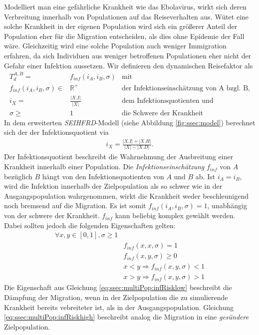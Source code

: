 Modelliert man eine gefährliche Krankheit wie das Ebolavirus, wirkt sich deren Verbreitung innerhalb von Populationen auf das Reiseverhalten aus. Wütet eine solche Krankheit in der eigenen Population wird sich ein größerer Anteil der Population eher für die Migration entscheiden, als dies ohne Epidemie der Fall wäre. Gleichzeitig wird eine solche Population auch weniger Immigration erfahren, da sich Individuen aus weniger betroffenen Populationen eher nicht der Gefahr einer Infektion aussetzen. Wir definieren den dynamischen Reisefaktor als
\begin{align}
	T^{A,B}_d =& f_{inf}(i_A,i_B, \sigma)&\text{mit}\\
	f_{inf}(i_A,i_B,\sigma) \in& \mathbb{R}^+&\text{der Infektionseinschätzung von A bzgl. B,}\label{eq:ssec:multiPop:infRisk}\\
	i_X =& \frac{|X.I|}{|X|}&\text{dem Infektionsquotienten und}\\
	\sigma \geq&1 & \text{die Schwere der Krankheit}\label{eq:ssec:multiPop:severity}
\end{align}
In dem erweiterten \emph{SEIHFRD}-Modell (siehe Abbildung \ref{fig:ssec:model}) berechnet sich der der Infektionsquotient via 
\begin{align}
	i_X = \frac{|X.I|+|X.H|}{|X| - |X.D|}.
\end{align}
Der Infektionsquotient beschreibt die Wahrnehmung der Ausbreitung einer Krankheit innerhalb einer Population. Die \emph{Infektionseinschätzung} $f_{inf}$ von $A$ bezüglich $B$ hängt von den Infektionsquotienten von $A$ und $B$ ab. Ist $i_A = i_B$, wird die Infektion innerhalb der Zielpopulation als so schwer wie in der Ausgangspopulation wahrgenommen, wirkt die Krankheit weder beschleunigend noch bremsend auf die Migration. Es ist somit $f_{inf}(i_A,i_B,\sigma)=1$, unabhängig von der schwere der Krankheit. $f_{inf}$ kann beliebig komplex gewählt werden. Dabei sollten jedoch die folgenden Eigenschaften gelten:
\begin{align}
	\forall x, y \in [0,1], \sigma \geq 1 & \nonumber\\
		& f_{inf}(x,x,\sigma) = 1\\
		& f_{inf}(x,y,\sigma) \geq 0\\
		& x < y \Rightarrow f_{inf}(x,y,\sigma) < 1 \label{eq:ssec:multiPop:infRisklow}\\
		& x > y \Rightarrow f_{inf}(x,y,\sigma) > 1 \label{eq:ssec:multiPop:infRiskhigh}
\end{align}
Die Eigenschaft aus Gleichung \ref{eq:ssec:multiPop:infRisklow} beschreibt die Dämpfung der Migration, wenn in der Zielpopulation die zu simulierende Krankheit bereits vebreiteter ist, als in der Ausgangspopulation. Gleichung \ref{eq:ssec:multiPop:infRiskhigh} beschreibt analog die Migration in eine \emph{gesündere} Zielpopulation.

